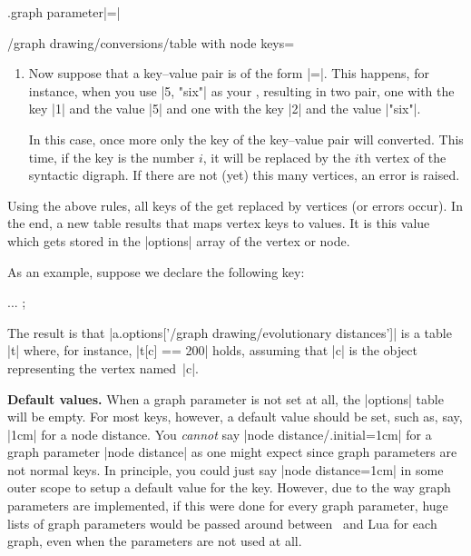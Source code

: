 \begin{handler}{{.graph parameter}|=|}
\begin{key}{/graph drawing/conversions/table with node keys=}
\begin{enumerate}
      Now, the key--value pair will be converted to a new key--value
      pair. The value will be the same as before, but the key 
      will be replaced by the vertex object whose |name| is the
      .
    \item Now suppose that a key--value pair is of the form
      |=|. This happens, for instance,
      when you use |{5, "six"}| as your , resulting in 
      two pair, one with the key |1| and the value |5| and one with
      the key |2| and the value |"six"|.

      In this case, once more only the key of the key--value pair will
      converted. This time, if the key is the number $i$, it will be
      replaced by the $i$th vertex of the syntactic digraph. If there
      are not (yet) this many vertices, an error is raised.
    \end{enumerate}
    Using the above rules, all keys of the  get replaced
    by vertices (or errors occur). In the end, a new table results
    that maps vertex keys to values. It is this value which gets
    stored in the |options| array of the vertex or node.

    As an example, suppose we declare the following key:
\begin{codeexample}
...
\tikz {};
\end{codeexample}
    The result is that |a.options['/graph drawing/evolutionary distances']|
    is a table |t| where, for instance, |t[c] == 200| holds, assuming
    that |c| is the object representing the vertex named~|c|.
  \end{key}
  
  \medskip
  \noindent\textbf{Default values.}
  When a graph parameter is not set at all, the |options| table will
  be empty. For most keys, however, a default
  value should be set, such as, say, |1cm| for a node distance. You
  \emph{cannot} say |node distance/.initial=1cm| for a graph
  parameter |node distance| as one might expect since graph parameters
  are not normal keys. In principle, you could just say
  |node distance=1cm| in some outer scope to setup a default value for the
  key. However, due to the way graph parameters are implemented, if
  this were done for every graph parameter, huge lists of graph
  parameters would be passed around between \pgfname\ and Lua for each
  graph, even when the parameters are not used at all.


\end{handler}
